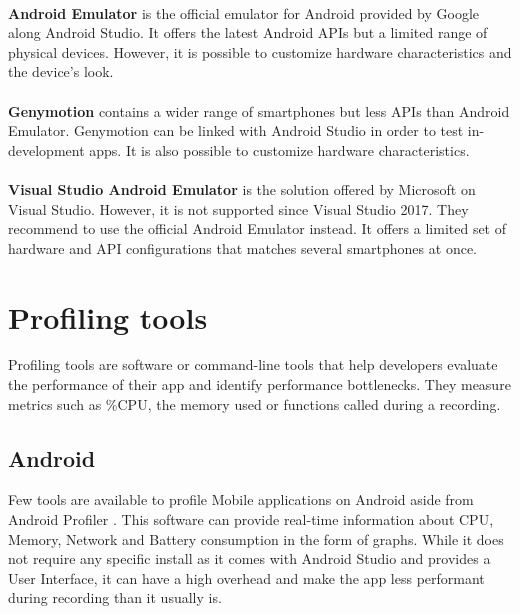 \documentclass{kththesis}
\begin{document}
\paragraph{}
\textbf{Android Emulator} \cite{android_emulator} is the official emulator for Android provided by Google along Android Studio. It offers the latest Android APIs but a limited range of physical devices. However, it is possible to customize hardware characteristics and the device's look.

\paragraph{}
\textbf{Genymotion} \cite{genymotion_emulator} contains a wider range of smartphones but less APIs than Android Emulator. Genymotion can be linked with Android Studio in order to test in-development apps. It is also possible to customize hardware characteristics.

\paragraph{}
\textbf{Visual Studio Android Emulator} \cite{microsoft_emulator} is the solution offered by Microsoft on Visual Studio. However, it is not supported since Visual Studio 2017. They recommend to use the official Android Emulator instead. It offers a limited set of hardware and API configurations that matches several smartphones at once. 

\section{Profiling tools}

Profiling tools are software or command-line tools that help developers evaluate the performance of their app and identify performance bottlenecks. They measure metrics such as \%CPU, the memory used or functions called during a recording.



\subsection{Android}

Few tools are available to profile Mobile applications on Android aside from Android Profiler \cite{nanoscope}. This software can provide real-time information about CPU, Memory, Network and Battery consumption in the form of graphs. While it does not require any specific install as it comes with Android Studio and provides a User Interface, it can have a high overhead \cite{nanoscope} and make the app less performant during recording than it usually is. 
\end{document}
